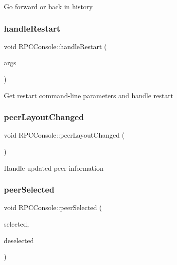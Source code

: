 Go forward or back in history \mbox{\label{class_r_p_c_console_a1aab203ab026fb80bd8aeb41f510b682}} 
\subsubsection{\texorpdfstring{handleRestart}{handleRestart}}
{\footnotesize\ttfamily void R\+P\+C\+Console\+::handle\+Restart (\begin{DoxyParamCaption}\item[{Q\+String\+List}]{args }\end{DoxyParamCaption})\hspace{0.3cm}{\ttfamily [signal]}}

Get restart command-\/line parameters and handle restart \mbox{\label{class_r_p_c_console_af952ebc6484c8f7d1262fa0bceed41bf}} 
\subsubsection{\texorpdfstring{peerLayoutChanged}{peerLayoutChanged}}
{\footnotesize\ttfamily void R\+P\+C\+Console\+::peer\+Layout\+Changed (\begin{DoxyParamCaption}{ }\end{DoxyParamCaption})\hspace{0.3cm}{\ttfamily [slot]}}

Handle updated peer information \mbox{\label{class_r_p_c_console_a2487fa6a90cddcbb17ae4bb13ecc5359}} 
\subsubsection{\texorpdfstring{peerSelected}{peerSelected}}
{\footnotesize\ttfamily void R\+P\+C\+Console\+::peer\+Selected (\begin{DoxyParamCaption}\item[{const Q\+Item\+Selection \&}]{selected,  }\item[{const Q\+Item\+Selection \&}]{deselected }\end{DoxyParamCaption})\hspace{0.3cm}{\ttfamily [slot]}}

